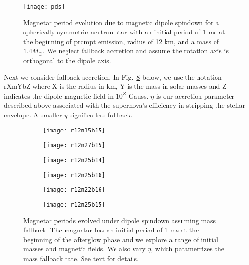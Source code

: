 \documentclass{article}
\begin{document}
\begin{figure}[h!]
\centering
\texttt{[image: pds]}
\caption{Magnetar period evolution due to magnetic dipole spindown for a spherically symmetric neutron star with an initial period of 1 ms at the beginning of prompt emission, radius of 12 km, and a mass of $1.4 M_{\odot}$. We neglect fallback accretion and assume the rotation axis is orthogonal to the dipole axis.}
\label{fig:2}
\end{figure}

Next we consider fallback accretion. In Fig.~\ref{fig:4} below, we use the notation rXmYbZ where X is the radius in km, Y is the mass in solar masses and Z indicates the dipole magnetic field in $10^Z$ Gauss. $\eta$ is our accretion parameter described above associated with the supernova's efficiency in stripping the stellar envelope. A smaller $\eta$ signifies less fallback.


\begin{figure}[h!]
\centering
\begin{subfigure}{.5\textwidth}
    \centering
    \texttt{[image: r12m15b15]}
    \caption{}
    \label{fig:4a}
\end{subfigure}%
\begin{subfigure}{.5\textwidth}
    \centering
    \texttt{[image: r12m27b15]}
    \caption{}
    \label{fig:4b}
\end{subfigure}
\begin{subfigure}{.5\textwidth}
    \centering
    \texttt{[image: r12m25b14]}
    \caption{}
    \label{fig:4c}
\end{subfigure}%
\begin{subfigure}{.5\textwidth}
    \centering
    \texttt{[image: r12m25b16]}
    \caption{}
    \label{fig:4d}
\end{subfigure}
\begin{subfigure}{.5\textwidth}
    \centering
    \texttt{[image: r12m22b16]}
    \caption{}
    \label{fig:4e}
\end{subfigure}%
\begin{subfigure}{.5\textwidth}
    \centering
    \texttt{[image: r12m25b15]}
    \caption{}
    \label{fig:4f}
\end{subfigure}
\caption{Magnetar periods evolved under dipole spindown assuming mass fallback. The magnetar has an initial period of 1 ms at the beginning of the afterglow phase and we explore a range of initial masses and magnetic fields. We also vary $\eta$, which parametrizes the mass fallback rate. See text for details.}
\label{fig:4}
\end{figure}
\end{document}

